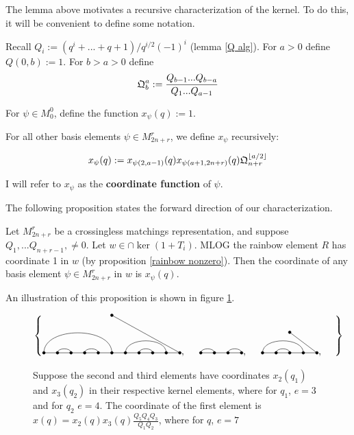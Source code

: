 \documentclass{amsart}
\begin{document}
\vspace{5mm}
The lemma above motivates a recursive characterization of the kernel. To do this, it will be convenient to define some notation.

\begin{definition}
	Recall $Q_i:=(q^i+...+q+1)/q^{i/2}(-1)^i$ (lemma \ref{Q alg}). For $a>0$ define $Q(0,b):=1$. For $b>a>0$ define $$\mathfrak{Q}_b^a:=\frac{Q_{b-1}...Q_{b-a}}{Q_1...Q_{a-1}}$$
	
\end{definition}

\begin{definition}
	For $\psi \in M_0^0$, define the function $x_\psi(q):=1$.
	
	For all other basis elements $\psi\in M_{2n+r}^r$, we define $x_\psi$ recursively:
	
	$$x_\psi(q):=x_{\psi(2,a-1)}(q)x_{\psi(a+1,2n+r)}(q)\mathfrak{Q}^{\lfloor a/2\rfloor}_{n+r}$$
	
	I will refer to $x_\psi$ as the \textbf{coordinate function} of $\psi$.
	
	\label{coeff def}
\end{definition}


\vspace{2mm}
The following proposition states the forward direction of our characterization.
\begin{proposition}
	
	Let $M_{2n+r}^r$ be a crossingless matchings representation, and suppose $Q_1,...Q_{n+r-1},\not=0$. Let $w\in\cap\ker(1+T_i)$. MLOG the rainbow element $R$ has coordinate 1 in $w$ (by proposition \ref{rainbow nonzero}). Then the coordinate of any basis element $\psi\in M_{2n+r}^r$ in $w$ is $x_{\psi}(q)$.
	
	\label{kernel characterization}
	
\end{proposition}

An illustration of this proposition is shown in figure \ref{coeff example}.


\begin{figure}
	\def\cbasisspacing{5mm}
	
	$\cbr{
		\begin{gathered}
		\GeneralizedMatching{11}{1/6, 2/3,4/5,7/10,8/9}{1}{11/1}{11/8}, \hspace{\cbasisspacing}
		\Matching{4}{1/2, 3/4}, 
		\hspace{\cbasisspacing}
		\GeneralizedMatching{5}{1/4, 2/3}{1}{5/1}{3/4}, \hspace{\cbasisspacing}
		\end{gathered}}$ 
	\caption{Suppose the second and third elements have coordinates $x_2(q_1)$ and $x_3(q_2)$ in their respective kernel elements, where for $q_1$, $e=3$ and for $q_2$ $e=4$. The coordinate of the first element is $x(q)=x_2(q)x_3(q)\frac{Q_5Q_4Q_3}{Q_1Q_2}$, where for $q$, $e=7$}
	\label{coeff example}
\end{figure}
\end{document}
